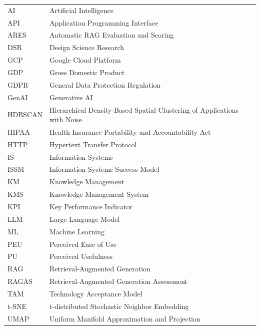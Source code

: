 \documentclass[
	english,
	ruledheaders=section,%
	class=report,%
	thesis={type=bachelor},%
	accentcolor=1b,%
	custommargins=true,%
	marginpar=false,%
	parskip=half-,%
	fontsize=11pt,%
	DIV=14,
]{tudapub}
\begin{document}
\begin{xtabular}{ll}
AI & Artificial Intelligence\\
API & Application Programming Interface\\
ARES & Automatic RAG Evaluation and Scoring \\
DSR & Design Science Research\\
GCP & Google Cloud Platform\\
GDP & Gross Domestic Product\\
GDPR & General Data Protection Regulation\\
GenAI & Generative AI\\
HDBSCAN & Hierarchical Density-Based Spatial Clustering of Applications with Noise\\
HIPAA & Health Insurance Portability and Accountability Act\\
HTTP & Hypertext Transfer Protocol\\
IS & Information Systems\\
ISSM & Information Systems Success Model\\
KM & Knowledge Management\\
KMS & Knowledge Management System\\
KPI & Key Performance Indicator\\
LLM & Large Language Model\\
ML & Machine Learning\\
PEU & Perceived Ease of Use\\
PU & Perceived Usefulness\\
RAG & Retrieval-Augmented Generation\\
RAGAS & Retrieval-Augmented Generation Assessment \\
TAM & Technology Acceptance Model\\
t-SNE & t-distributed Stochastic Neighbor Embedding \\
UMAP & Uniform Manifold Approximation and Projection\\
\end{xtabular}

\onehalfspacing
\setcounter{seitenzahlroemisch}{\value{page}}
\end{document}
